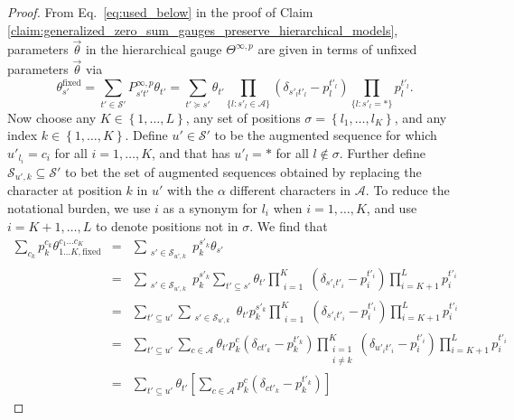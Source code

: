 \documentclass{article}
\numberwithin{myclaim}{section}
\newcommand{\eq}[1]{Eq.\ \ref{#1}}
\newcommand{\set}[1]{\left\{ #1 \right\}}
\newcommand{\myfixed}{\mathrm{fixed}}
\begin{document}
\begin{proof}
From \eq{eq:used_below} in the proof of Claim \ref{claim:generalized_zero_sum_gauges_preserve_hierarchical_models}, parameters $\vec{\theta}$ in the hierarchical gauge $\Theta^{\infty,p}$ are given in terms of unfixed parameters $\vec{\theta}$ via 
\begin{equation}
    \theta_{s'}^\myfixed = \sum_{t' \in \mathcal{S}'}  P^{\infty,p}_{s' t'} \theta_{t'} =  \sum_{t' \succeq s'} \theta_{t'} 
        \prod_{\{l: s'_l \in \mathcal{A}  \}}\!\! \left(\delta_{s'_l t'_l} - p^{t'_l}_l \right) 
        \prod_{\{l: s'_l = * \}}\!\! p^{t'_l}_l. \label{eq:141}    
\end{equation}
Now choose any $K \in \set{1, \ldots, L}$, any set of positions $\sigma = \set{l_1,\ldots,l_K}$, and any index $k \in \set{1, \ldots, K}$. Define $u' \in \mathcal{S}'$ to be the augmented sequence for which $u'_{l_i} = c_i$ for all $i = 1, \ldots, K$, and that has $u'_l = *$ for all $l \notin \sigma$.  Further define $\mathcal{S}_{u',k} \subseteq \mathcal{S}'$ to bet the set of augmented sequences obtained by replacing the character at position $k$ in $u'$ with the $\alpha$ different characters in $\mathcal{A}$. To reduce the notational burden, we use $i$ as a synonym for $l_i$ when $i = 1, \ldots, K$, and use $i = K+1, \ldots, L$ to denote positions not in $\sigma$. We find that 
\begin{eqnarray}
    \sum_{c_k} p_{k}^{c_k} \theta_{1\ldots K,\myfixed}^{c_1\ldots c_K} &=& \sum_{\substack{s' \in \mathcal{S}_{u',k}}} p_k^{s'_k} \theta_{s'} \label{eq:142} \\
    &=& \sum_{\substack{s' \in \mathcal{S}_{u',k}}} p_k^{s'_k} \sum_{t' \subseteq s'} \theta_{t'} 
        \prod_{\substack{i=1}}^K\!\! \left(\delta_{s'_i t'_i} - p^{t'_i}_i \right) 
        \prod_{i=K+1}^L p^{t'_i}_i \label{eq:143} \\
    &=& \sum_{t' \subseteq u'} \sum_{\substack{s' \in \mathcal{S}_{u',k}}} \theta_{t'}  p_k^{s'_k}  
        \prod_{\substack{i=1}}^K\!\! \left(\delta_{s'_i t'_i} - p^{t'_i}_i \right) 
        \prod_{i=K+1}^L p^{t'_i}_i \label{eq:144} \\
    &=& \sum_{t' \subseteq u'} \sum_{c \in \mathcal{A}} \theta_{t'} p_k^c (\delta_{c t'_k} - p_k^{t'_k})
        \prod_{\substack{i=1 \\ i \neq k}}^K\!\! \left(\delta_{u'_i t'_i} - p^{t'_i}_i \right) 
        \prod_{i=K+1}^L p^{t'_i}_i \label{eq:145} \\
     &=& \sum_{t' \subseteq u'}  \theta_{t'} \left[ \sum_{c \in \mathcal{A}} p_k^c (\delta_{c t'_k} - p_k^{t'_k})\right]

\end{eqnarray}
\end{proof}
\end{document}
